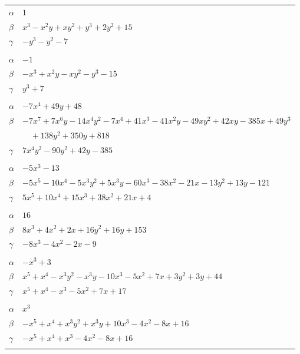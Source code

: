 \documentclass[11pt]{article}
\begin{document}
\begin{longtable}{@{}ll@{}}
$\alpha$ & $1$\\
$\beta$ & $x^{3}-x^{2}y+xy^{2}+y^{3}+2y^{2}+15$\\
$\gamma$ & $-y^{3}-y^{2}-7$\\
\addlinespace[3pt]
\multicolumn{2}{@{}l}{$\{i,j\}=\{1,9\}$, $k_{ij}=2\cdot 3$}\\
$\alpha$ & $-1$\\
$\beta$ & $-x^{3}+x^{2}y-xy^{2}-y^{3}-15$\\
$\gamma$ & $y^{3}+7$\\
\addlinespace[3pt]
\multicolumn{2}{@{}l}{$\{i,j\}=\{1,20\}$, $k_{ij}=2^{4}\cdot 3$}\\
$\alpha$ & $-7x^{4}+49y+48$\\
$\beta$ & $-7x^{7}+7x^{6}y-14x^{4}y^{2}-7x^{4}+41x^{3}-41x^{2}y-49xy^{2}+42xy-385x+49y^{3}$\\
 & $\quad +138y^{2}+350y+818$\\
$\gamma$ & $7x^{4}y^{2}-90y^{2}+42y-385$\\
\addlinespace[3pt]
\multicolumn{2}{@{}l}{$\{i,j\}=\{2,20\}$, $k_{ij}=2^{2}\cdot 3^{3}$}\\
$\alpha$ & $-5x^{3}-13$\\
$\beta$ & $-5x^{5}-10x^{4}-5x^{3}y^{2}+5x^{3}y-60x^{3}-38x^{2}-21x-13y^{2}+13y-121$\\
$\gamma$ & $5x^{5}+10x^{4}+15x^{3}+38x^{2}+21x+4$\\
\addlinespace[3pt]
\multicolumn{2}{@{}l}{$\{i,j\}=\{3,8\}$, $k_{ij}=13^{2}$}\\
$\alpha$ & $16$\\
$\beta$ & $8x^{3}+4x^{2}+2x+16y^{2}+16y+153$\\
$\gamma$ & $-8x^{3}-4x^{2}-2x-9$\\
\addlinespace[3pt]
\multicolumn{2}{@{}l}{$\{i,j\}=\{3,16\}$, $k_{ij}=2^{6}$}\\
$\alpha$ & $-x^{3}+3$\\
$\beta$ & $x^{5}+x^{4}-x^{3}y^{2}-x^{3}y-10x^{3}-5x^{2}+7x+3y^{2}+3y+44$\\
$\gamma$ & $x^{5}+x^{4}-x^{3}-5x^{2}+7x+17$\\
\addlinespace[3pt]
\multicolumn{2}{@{}l}{$\{i,j\}=\{3,18\}$, $k_{ij}=2^{5}$}\\
$\alpha$ & $x^{3}$\\
$\beta$ & $-x^{5}+x^{4}+x^{3}y^{2}+x^{3}y+10x^{3}-4x^{2}-8x+16$\\
$\gamma$ & $-x^{5}+x^{4}+x^{3}-4x^{2}-8x+16$\\
\addlinespace[3pt]
\multicolumn{2}{@{}l}{$\{i,j\}=\{4,13\}$, $k_{ij}=2^{3}\cdot 3^{2}$}\\

\end{longtable}
\end{document}
